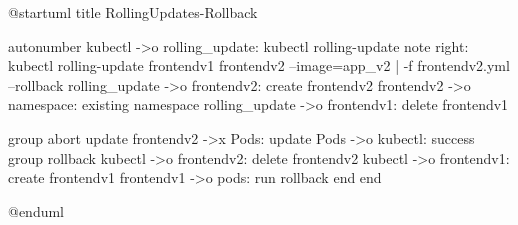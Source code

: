 @startuml
title RollingUpdates-Rollback

autonumber
kubectl ->o rolling_update: kubectl rolling-update
note right: kubectl rolling-update frontendv1 frontendv2 --image=app_v2 | -f frontendv2.yml --rollback
rolling_update ->o frontendv2: create frontendv2
frontendv2 ->o namespace: existing namespace
rolling_update ->o frontendv1: delete frontendv1

group abort update
  frontendv2 ->x Pods: update
  Pods ->o kubectl: success
  group rollback
    kubectl ->o frontendv2: delete frontendv2
    kubectl ->o frontendv1: create frontendv1
    frontendv1 ->o pods: run rollback
    end
end

@enduml
